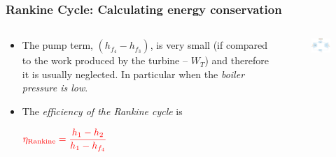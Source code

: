 \documentclass[10pt,compress,handout,ignorenonframetext]{beamer}
\begin{document}
\begin{frame}
 \frametitle{Rankine Cycle: Calculating energy conservation}
  \begin{columns}
   \begin{column}[c]{0.4\linewidth}
    \begin{itemize}
      \item <1-> The pump term, $\left(h_{f_{4}}-h_{f_{3}}\right)$, is very small (if compared to the work produced by the turbine -- $W_{T}$) and therefore it is usually neglected. In particular when the {\it boiler pressure is low}.
      \item <2-> The {\it efficiency of the Rankine cycle} is
\begin{center}
         $ \textcolor{red}{\eta_{\text{Rankine}}=\displaystyle\frac{h_{1}-h_{2}}{h_{1}-h_{f_{4}}}}$ 
\end{center}
     \end{itemize}
    \end{column}
    \begin{column}[c]{0.6\linewidth}
     \begin{figure}%
      \begin{center}
       \includegraphics[width=6.5cm,clip]{./Pics/Simple_Rankine_Cycle}
      \end{center}
     \end{figure}
    \end{column}
   \end{columns}
 \normalsize
\end{frame}
\end{document}
